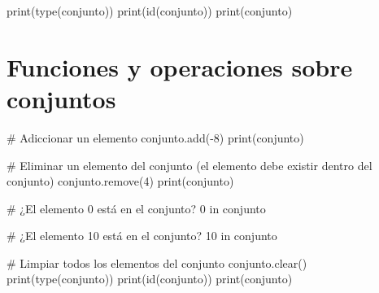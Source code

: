 \documentclass[
  letterpaper,
  DIV=11,
  numbers=noendperiod]{scrreprt}
\newenvironment{Shaded}{\begin{snugshade}}{\end{snugshade}}
\newcommand{\BuiltInTok}[1]{\textcolor[rgb]{0.00,0.23,0.31}{#1}}
\newcommand{\CommentTok}[1]{\textcolor[rgb]{0.37,0.37,0.37}{#1}}
\newcommand{\DecValTok}[1]{\textcolor[rgb]{0.68,0.00,0.00}{#1}}
\newcommand{\KeywordTok}[1]{\textcolor[rgb]{0.00,0.23,0.31}{#1}}
\newcommand{\NormalTok}[1]{\textcolor[rgb]{0.00,0.23,0.31}{#1}}
\newcommand{\OperatorTok}[1]{\textcolor[rgb]{0.37,0.37,0.37}{#1}}
\begin{document}
\begin{Shaded}
\begin{Highlighting}[]
\BuiltInTok{print}\NormalTok{(}\BuiltInTok{type}\NormalTok{(conjunto))}
\BuiltInTok{print}\NormalTok{(}\BuiltInTok{id}\NormalTok{(conjunto))}
\BuiltInTok{print}\NormalTok{(conjunto)}
\end{Highlighting}
\end{Shaded}

\section{Funciones y operaciones sobre
conjuntos}\label{funciones-y-operaciones-sobre-conjuntos}

\begin{Shaded}
\begin{Highlighting}[]
\CommentTok{\# Adiccionar un elemento}
\NormalTok{conjunto.add(}\OperatorTok{{-}}\DecValTok{8}\NormalTok{)}
\BuiltInTok{print}\NormalTok{(conjunto)}
\end{Highlighting}
\end{Shaded}

\begin{Shaded}
\begin{Highlighting}[]
\CommentTok{\# Eliminar un elemento del conjunto (el elemento debe existir dentro del conjunto)}
\NormalTok{conjunto.remove(}\DecValTok{4}\NormalTok{)}
\BuiltInTok{print}\NormalTok{(conjunto)}
\end{Highlighting}
\end{Shaded}

\begin{Shaded}
\begin{Highlighting}[]
\CommentTok{\# ¿El elemento 0 está en el conjunto?}
\DecValTok{0} \KeywordTok{in}\NormalTok{ conjunto}
\end{Highlighting}
\end{Shaded}

\begin{Shaded}
\begin{Highlighting}[]
\CommentTok{\# ¿El elemento 10 está en el conjunto?}
\DecValTok{10} \KeywordTok{in}\NormalTok{ conjunto}
\end{Highlighting}
\end{Shaded}

\begin{Shaded}
\begin{Highlighting}[]
\CommentTok{\# Limpiar todos los elementos del conjunto}
\NormalTok{conjunto.clear()}
\BuiltInTok{print}\NormalTok{(}\BuiltInTok{type}\NormalTok{(conjunto))}
\BuiltInTok{print}\NormalTok{(}\BuiltInTok{id}\NormalTok{(conjunto))}
\BuiltInTok{print}\NormalTok{(conjunto)}
\end{Highlighting}
\end{Shaded}
\end{document}
